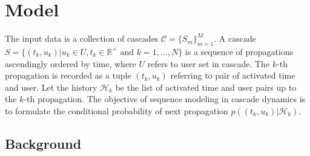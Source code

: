\section{Model}

The input data is a collection of cascades $\mathcal{C}=\{S_m\}_{m=1}^M$. 
A cascade $S=\{(t_k, u_k)|u_k\in U, t_k\in \mathbb{R}^+ \text{~and~}
k=1,\dots,N\}$ is a sequence of propagations ascendingly ordered by time, where $U$ refers to 
user set in cascade. The $k$-th propagation is recorded
as a tuple $(t_k, u_k)$ referring to pair of activated time and user.
Let the history $\mathcal{H}_k$ be the list of activated time and user pairs up
to the $k$-th propagation. The objective of sequence modeling in cascade dynamics is to
formulate the conditional probability of next propagation
$p((t_k, u_k)|\mathcal{H}_k)$.

\subsection{Background}


